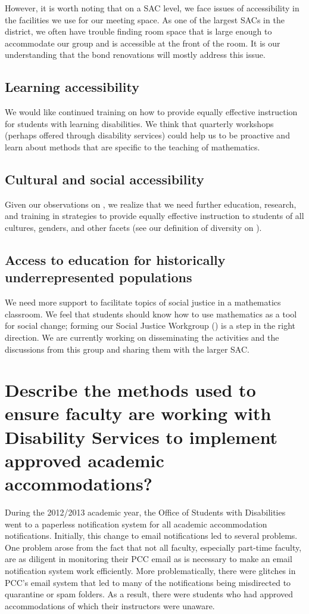 However, it is worth noting that on a SAC level, we face issues of
accessibility in the facilities we use for our meeting space. As one of the
largest SACs in the district, we often have trouble finding room space that is
large enough to accommodate our group and is accessible at the front of the
room. It is our understanding that the bond renovations will mostly address
this issue.

\subsection{Learning accessibility}
We would like continued training on how to provide equally effective
instruction for students with learning disabilities. We think that quarterly
workshops (perhaps offered through disability services) could help us to be
proactive and learn about methods that are specific to the teaching of
mathematics.

\subsection{Cultural and social accessibility}
Given our observations on , we realize that we need
further education, research, and training in strategies to provide equally
effective instruction to students of all cultures, genders, and other facets
(see our definition of diversity on ).

\subsection{Access to education for historically underrepresented populations}
We need more support to facilitate topics of social justice in a mathematics classroom. We
feel that students should know how to use mathematics as a tool for social
change; forming our Social Justice Workgroup () is
a step in the right direction. We are currently working on disseminating the activities and the discussions from this
group and sharing them with the larger SAC.

\section[Approved academic accommodations]{Describe the methods used to ensure
 faculty are working with Disability Services to implement approved academic
accommodations?}
During the 2012/2013 academic year, the Office of Students with Disabilities
went to a paperless notification system for all academic accommodation
notifications.  Initially, this change to email notifications led to several
problems.  One problem arose from the fact that not all faculty, especially
part-time faculty, are as diligent in monitoring their PCC email as is
necessary to make an email notification system work efficiently.  More
problematically, there were glitches in PCC's email system that led to many of the
notifications being misdirected to quarantine or spam folders.  As a result,
there were students who had approved accommodations of which their instructors
were unaware.

